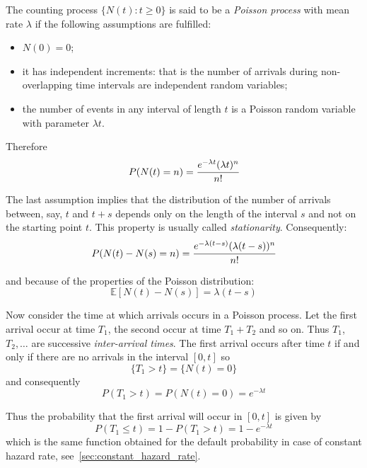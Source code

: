 The counting process $\{N(t):t\ge 0\}$ is said to be a \emph{Poisson process} with mean rate $\lambda$ if the following assumptions are fulfilled:
\begin{itemize}
\item $N(0)=0$;
\item it has independent increments: that is the number of arrivals during non-overlapping time intervals are independent random variables;
\item the number of events in any interval of length $t$ is a Poisson random variable with parameter $\lambda t$.
\end{itemize}

Therefore
\begin{equation}
P(N(t)=n)=\cfrac{e^{-\lambda t}(\lambda t)^n}{n!}
\label{eq:poisson_pdf}
\end{equation}

The last assumption implies that the distribution of the number of arrivals between, say, $t$ and $t+s$ depends only on the length of the interval $s$ and not on the starting point $t$. This property is usually called \emph{stationarity}. Consequently:
\begin{equation}
P(N(t)-N(s)=n)=\cfrac{e^{-\lambda (t-s)}(\lambda (t-s))^n}{n!}
\end{equation}

and because of the properties of the Poisson distribution:
\begin{equation}
\mathbb{E}[N(t)-N(s)]=\lambda (t-s)
\end{equation}

Now consider the time at which arrivals occurs in a Poisson process. Let the first arrival occur at time $T_1$, the second occur at time $T_1 + T_2$ and so on. Thus $T_1$, $T_2, \ldots$ are successive \emph{inter-arrival times}. The first arrival occurs after time $t$ if and only if there are no arrivals in the interval $[0,t]$ so 
\begin{equation}
\{T_1>t\}=\{N(t)=0\}
\end{equation}
and consequently
\begin{equation}
P(T_1>t)=P(N(t)=0)=e^{-\lambda t}
\end{equation}

Thus the probability that the first arrival will occur in $[0,t]$ is given by
\begin{equation}
P(T_1\le t)= 1-P(T_1>t)=1-e^{-\lambda t}
\end{equation}
which is the same function obtained for the default probability in case of constant hazard rate, see~\ref{sec:constant_hazard_rate}.

